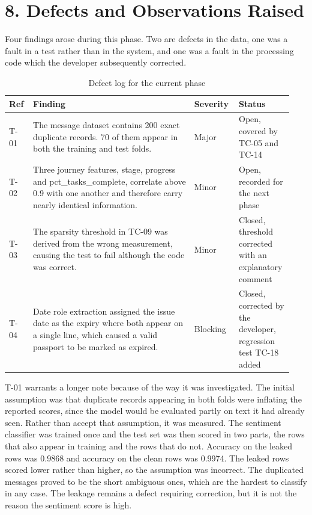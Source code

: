 \documentclass[11pt,a4paper]{article}
\begin{document}
\section{8. Defects and Observations Raised}
Four findings arose during this phase. Two are defects in the data, one was a fault in a test rather than in the system, and one was a fault in the processing code which the developer subsequently corrected.

\begin{table}[!t]
\centering
\caption{Defect log for the current phase}
\small
\setlength{\tabcolsep}{3pt}
\begin{tabular}{p{0.073\linewidth}p{0.543\linewidth}p{0.136\linewidth}p{0.188\linewidth}}
\toprule
\textbf{Ref} & \textbf{Finding} & \textbf{Severity} & \textbf{Status} \\
\midrule
T-01 & The message dataset contains 200 exact duplicate records. 70 of them appear in both the training and test folds. & Major & Open, covered by TC-05 and TC-14 \\
T-02 & Three journey features, stage, progress and pct\_tasks\_complete, correlate above 0.9 with one another and therefore carry nearly identical information. & Minor & Open, recorded for the next phase \\
T-03 & The sparsity threshold in TC-09 was derived from the wrong measurement, causing the test to fail although the code was correct. & Minor & Closed, threshold corrected with an explanatory comment \\
T-04 & Date role extraction assigned the issue date as the expiry where both appear on a single line, which caused a valid passport to be marked as expired. & Blocking & Closed, corrected by the developer, regression test TC-18 added \\
\bottomrule
\end{tabular}
\end{table}

T-01 warrants a longer note because of the way it was investigated. The initial assumption was that duplicate records appearing in both folds were inflating the reported scores, since the model would be evaluated partly on text it had already seen. Rather than accept that assumption, it was measured. The sentiment classifier was trained once and the test set was then scored in two parts, the rows that also appear in training and the rows that do not. Accuracy on the leaked rows was 0.9868 and accuracy on the clean rows was 0.9974. The leaked rows scored lower rather than higher, so the assumption was incorrect. The duplicated messages proved to be the short ambiguous ones, which are the hardest to classify in any case. The leakage remains a defect requiring correction, but it is not the reason the sentiment score is high.
\end{document}
